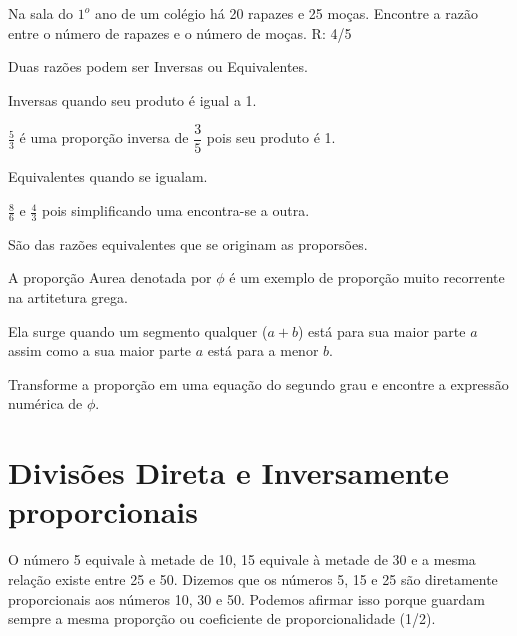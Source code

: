 \begin{exe}
Na sala do $1^o$ ano de um colégio há 20 rapazes e 25 moças. Encontre a razão entre o número de rapazes e o número de moças. R: 4/5
\end{exe}

Duas razões podem ser Inversas ou Equivalentes.

\begin{defi}
Inversas quando seu produto é igual a 1.
\end{defi}

\begin{exe}
$\frac{5}{3}$ é uma proporção inversa de $\dfrac{3}{5}$ pois seu produto é 1.
\end{exe}

\begin{defi}
Equivalentes quando se igualam.
\end{defi}
\begin{exe}
$\frac{8}{6}$ e $\frac{4}{3}$ pois simplificando uma encontra-se a outra.
\end{exe}

São das razões equivalentes que se originam as proporsões.

\begin{exe}
A proporção Aurea denotada por $\phi$ é um exemplo de proporção muito recorrente na artitetura grega.

Ela surge quando um segmento qualquer ($a+b$) está para sua maior parte $a$ assim como a sua maior parte $a$ está para a menor $b$. 

\begin{center}
\end{center}
\end{exe}

Transforme a proporção em uma equação do segundo grau e encontre a expressão numérica de $\phi$.

\section{Divisões Direta e Inversamente proporcionais}

O número 5 equivale à metade de 10, 15 equivale à metade de 30 e a mesma relação existe entre 25 e 50. Dizemos que os números 5, 15 e 25 são diretamente proporcionais aos números 10, 30 e 50. Podemos afirmar isso porque guardam sempre a mesma proporção ou coeficiente de proporcionalidade (1/2).

